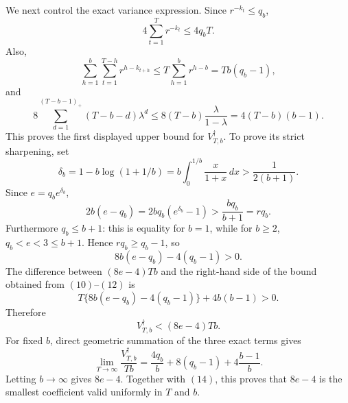 We next control the exact variance expression. Since \(r^{-k_t}\le q_b\),
\[
4\sum_{t=1}^Tr^{-k_t}\le4q_bT.
\tag{10}
\]
Also,
\[
\sum_{h=1}^b\sum_{t=1}^{T-h}r^{h-k_{t+h}}
\le T\sum_{h=1}^br^{h-b}=Tb(q_b-1),
\tag{11}
\]
and
\[
8\sum_{d=1}^{(T-b-1)_+}(T-b-d)\lambda^d
\le8(T-b)\frac{\lambda}{1-\lambda}=4(T-b)(b-1).
\tag{12}
\]
This proves the first displayed upper bound for \(V_{T,b}^{\dagger}\). To prove its strict sharpening, set
\[
\delta_b=1-b\log(1+1/b)=b\int_0^{1/b}\frac{x}{1+x}\,dx>\frac{1}{2(b+1)}.
\]
Since \(e=q_be^{\delta_b}\),
\[
2b(e-q_b)=2bq_b(e^{\delta_b}-1)>\frac{bq_b}{b+1}=r q_b.
\]
Furthermore \(q_b\le b+1\): this is equality for \(b=1\), while for \(b\ge2\), \(q_b<e<3\le b+1\). Hence \(rq_b\ge q_b-1\), so
\[
8b(e-q_b)-4(q_b-1)>0.
\tag{13}
\]
The difference between \((8e-4)Tb\) and the right-hand side of the bound obtained from \((10)\)--\((12)\) is
\[
T\{8b(e-q_b)-4(q_b-1)\}+4b(b-1)>0.
\]
Therefore
\[
V_{T,b}^{\dagger}<(8e-4)Tb.
\tag{14}
\]
For fixed \(b\), direct geometric summation of the three exact terms gives
\[
\lim_{T\to\infty}\frac{V_{T,b}^{\dagger}}{Tb}=\frac{4q_b}{b}+8(q_b-1)+4\frac{b-1}{b}.
\]
Letting \(b\to\infty\) gives \(8e-4\). Together with \((14)\), this proves that \(8e-4\) is the smallest coefficient valid uniformly in \(T\) and \(b\).

